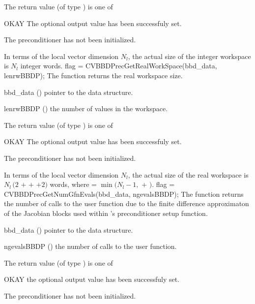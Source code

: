 {
  The return value  (of type ) is one of
  \begin{args}
  \item[OKAY] 
    The optional output value has been successfuly set.
  \item[\Id{BBDP\_NO\_DATA}]
    The {\cvbbdpre} preconditioner has not been initialized.
  \end{args}
}
{
  In terms of the local vector dimension $N_{l}$, the actual size of the integer workspace
  is $N_l$ integer words.
}
{
  flag = CVBBDPrecGetRealWorkSpace(bbd\_data, lenrwBBDP);
}
{
  The function  returns the
  {\cvbbdpre} real workspace size.
}
{
  \begin{args}[lenrwBBDP]
  \item[bbd\_data] ()
    pointer to the {\cvbbdpre} data structure.
  \item[lenrwBBDP] ()
    the number of  values in the {\cvbbdpre} workspace.
  \end{args}
}
{
  The return value  (of type ) is one of
  \begin{args}
  \item[OKAY] 
    The optional output value has been successfuly set.
  \item[\Id{BBDP\_NO\_DATA}]
    The {\cvbbdpre} preconditioner has not been initialized.
  \end{args}
}
{
  In terms of the local vector dimension $N_l$, the actual size of the real workspace is
  $N_l \,(2$  $+$  $+$  $+2)$  words,
  where  = $\min ( N_l - 1 ,$  $+$ $)$.
}
{
  flag = CVBBDPrecGetNumGfnEvals(bbd\_data, ngevalsBBDP);
}
{
  The function  returns the
  number of calls to the user  function due to the 
  finite difference approximaton of the Jacobian blocks used within
  {\cvbbdpre}'s preconditioner setup function.
}
{
  \begin{args}[ngevalsBBDP]
  \item[bbd\_data] ()
    pointer to the {\cvbbdpre} data structure.
  \item[ngevalsBBDP] ()
    the number of calls to the user  function.
  \end{args}
}
{
  The return value  (of type ) is one of
  \begin{args}
  \item[OKAY] 
    the optional output value has been successfuly set.
  \item[\Id{BBDP\_NO\_DATA}]
    The {\cvbbdpre} preconditioner has not been initialized.
  \end{args}
}
{}

